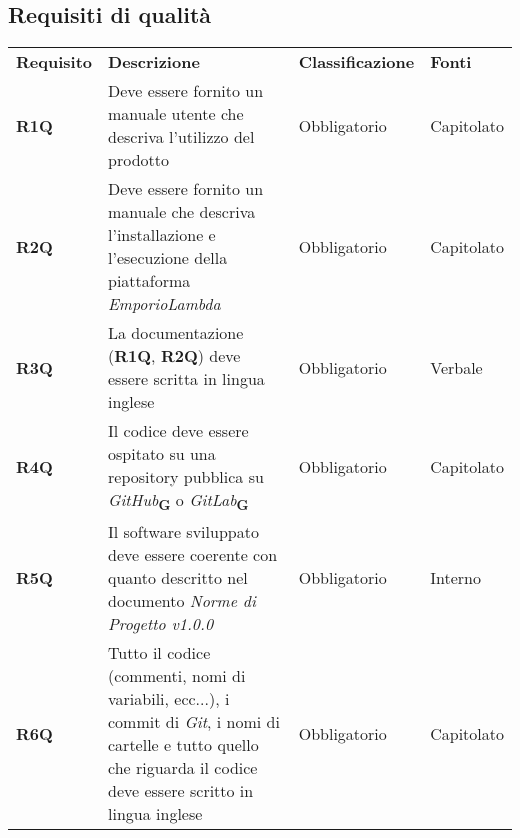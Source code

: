 \subsection{Requisiti di qualità}
\begin{center}
    \centering
    \renewcommand{\arraystretch}{1.8}
    \label{tab:RequisitiQualita}
    \begin{longtable}[!h]{p{50px} p{200px} p{100px} p{50px}}
        \rowcolor{logo!70} \textbf{Requisito} & \textbf{Descrizione}                                                                                                                                                 & \textbf{Classificazione} & \textbf{Fonti} \\
        \textbf{R1Q}                          & Deve essere fornito un manuale utente che descriva l'utilizzo del prodotto                                                                                               & Obbligatorio             & Capitolato     \\
        \textbf{R2Q}                          & Deve essere fornito un manuale che descriva l'installazione e l'esecuzione della piattaforma \textit{EmporioLambda}                                                                                  & Obbligatorio             & Capitolato     \\
        \textbf{R3Q}                          & La documentazione (\textbf{R1Q}, \textbf{R2Q}) deve essere scritta in lingua inglese                                                                                                            & Obbligatorio             & Verbale     \\
        \textbf{R4Q}                          & Il codice deve essere ospitato su una repository pubblica su \textit{GitHub}\textsubscript{\textbf{G}} o \textit{GitLab}\textsubscript{\textbf{G}}                                                              & Obbligatorio             & Capitolato     \\
        \textbf{R5Q}                          & Il software sviluppato deve essere coerente con quanto descritto nel documento \textit{Norme di Progetto v1.0.0}                                                     & Obbligatorio             & Interno        \\
        \textbf{R6Q}                          & Tutto il codice (commenti, nomi di variabili, ecc...), i commit di \textit{Git}, i nomi di cartelle e tutto quello che riguarda il codice deve essere scritto in lingua inglese & Obbligatorio             & Capitolato     \\

\end{longtable}
\end{center}
